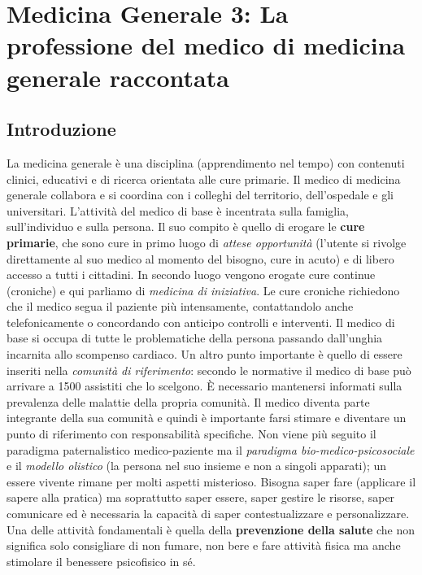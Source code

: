 \section{Medicina Generale 3: La professione del medico di medicina generale raccontata}

\subsection{Introduzione}

La medicina generale è una disciplina (apprendimento nel tempo) con
contenuti clinici, educativi e di ricerca orientata alle cure primarie.
Il medico di medicina generale collabora e si coordina con i colleghi
del territorio, dell'ospedale e gli universitari. L'attività del medico
di base è incentrata sulla famiglia, sull'individuo e sulla persona. Il
suo compito è quello di erogare le \textbf{cure primarie}, che sono cure
in primo luogo di \emph{attese opportunità} (l'utente si rivolge
direttamente al suo medico al momento del bisogno, cure in acuto) e di
libero accesso a tutti i cittadini. In secondo luogo vengono erogate
cure continue (croniche) e qui parliamo di \emph{medicina di
iniziativa}. Le cure croniche richiedono che il medico segua il paziente
più intensamente, contattandolo anche telefonicamente o concordando con
anticipo controlli e interventi. Il medico di base si occupa di tutte le
problematiche della persona passando dall'unghia incarnita allo
scompenso cardiaco. Un altro punto importante è quello di essere
inseriti nella \emph{comunità di riferimento}: secondo le normative il
medico di base può arrivare a 1500 assistiti che lo scelgono. È
necessario mantenersi informati sulla prevalenza delle malattie della
propria comunità. Il medico diventa parte integrante della sua comunità
e quindi è importante farsi stimare e diventare un punto di riferimento
con responsabilità specifiche. Non viene più seguito il paradigma
paternalistico medico-paziente ma il \emph{paradigma
bio-medico-psicosociale} e il \emph{modello olistico} (la persona nel
suo insieme e non a singoli apparati); un essere vivente rimane per
molti aspetti misterioso. Bisogna saper fare (applicare il sapere alla
pratica) ma soprattutto saper essere, saper gestire le risorse, saper
comunicare ed è necessaria la capacità di saper contestualizzare e
personalizzare. Una delle attività fondamentali è quella della
\textbf{prevenzione della salute} che non significa solo consigliare di
non fumare, non bere e fare attività fisica ma anche stimolare il
benessere psicofisico in sé.

